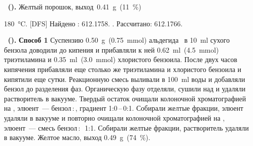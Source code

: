 \textbf{~().}
Желтый порошок, выход~\SI{0.41}{\gram}~(\SI{11}{\percent})
\begin{experimental}[]
     \SI{180}{\celsius}.
    [DFS] Найдено \ce{[M+]}: \num{612.1758}. . Рассчитано:  \num{612.1766}.
\end{experimental}


\textbf{~().} \textbf{Способ 1} Суспензию \SI{0.50}{\gram}~(\SI{0.75}{\mmol}) альдегида~\textbf{} в \SI{10}{\milli\litre} сухого бензола доводили до кипения и прибавляли к ней \SI{0.62}{\milli\litre}~(\SI{4.5}{\mmol}) триэтиламина и \SI{0.35}{\milli\litre}~(\SI{3.0}{\mmol}) хлористого бензоила. После двух часов кипячения прибавляли еще столько же триэтиламина и хлористого бензоила и кипятили еще сутки. Реакционную смесь выливали в \SI{100}{\milli\litre} воды и добавляли бензол до разделения фаз. Органическую фазу отделяли, сушили над  и удаляли растворитель в вакууме. Твердый остаток очищали колоночной хроматографией на , элюент~--- бензол\,:\,, градиент 1:0\,--\,0:1. Собирали желтые фракции, элюент удаляли в вакууме и повторно очищали колоночной хроматографией на , элюент~--- смесь бензол\,:\,~1:1. Собирали желтые фракции, растворитель удаляли в вакууме. Желтое масло, выход \SI{0.49}{\gram}~(\SI{74}{\percent}).

